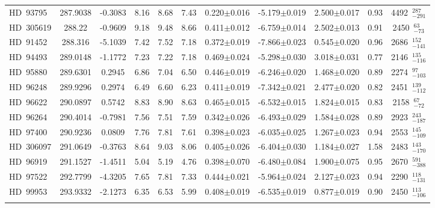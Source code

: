 {\begin{longtable}{lcccccccccc}
\noalign{\smallskip}
HD~93795 & 287.9038 & -0.3083 & 8.16 & 8.68 & 7.43 & 0.220$\pm$0.016 & -5.179$\pm$0.019 & 2.500$\pm$0.017 & 0.93 & 4492~$_{-291}^{287}$ \\
\noalign{\smallskip}
HD~305619 & 288.22 & -0.9609 & 9.18 & 9.48 & 8.66 & 0.411$\pm$0.012 & -6.759$\pm$0.014 & 2.502$\pm$0.013 & 0.91 & 2450~$_{-73}^{63}$ \\
\noalign{\smallskip}
HD~91452 & 288.316 & -5.1039 & 7.42 & 7.52 & 7.18 & 0.372$\pm$0.019 & -7.866$\pm$0.023 & 0.545$\pm$0.020 & 0.96 & 2686~$_{-141}^{152}$ \\
\noalign{\smallskip}
HD~94493 & 289.0148 & -1.1772 & 7.23 & 7.22 & 7.18 & 0.469$\pm$0.024 & -5.298$\pm$0.030 & 3.018$\pm$0.031 & 0.77 & 2146~$_{-116}^{135}$ \\
\noalign{\smallskip}
HD~95880 & 289.6301 & 0.2945 & 6.86 & 7.04 & 6.50 & 0.446$\pm$0.019 & -6.246$\pm$0.020 & 1.468$\pm$0.020 & 0.89 & 2274~$_{-103}^{97}$ \\
\noalign{\smallskip}
HD~96248 & 289.9296 & 0.2974 & 6.49 & 6.60 & 6.23 & 0.411$\pm$0.019 & -7.342$\pm$0.021 & 2.477$\pm$0.020 & 0.82 & 2451~$_{-112}^{139}$ \\
\noalign{\smallskip}
HD~96622 & 290.0897 & 0.5742 & 8.83 & 8.90 & 8.63 & 0.465$\pm$0.015 & -6.532$\pm$0.015 & 1.824$\pm$0.015 & 0.83 & 2158~$_{-72}^{67}$ \\
\noalign{\smallskip}
HD~96264 & 290.4014 & -0.7981 & 7.56 & 7.51 & 7.59 & 0.342$\pm$0.026 & -6.493$\pm$0.029 & 1.584$\pm$0.028 & 0.89 & 2923~$_{-187}^{243}$ \\
\noalign{\smallskip}
HD~97400 & 290.9236 & 0.0809 & 7.76 & 7.81 & 7.61 & 0.398$\pm$0.023 & -6.035$\pm$0.025 & 1.267$\pm$0.023 & 0.94 & 2553~$_{-109}^{145}$ \\
\noalign{\smallskip}
HD~306097 & 291.0649 & -0.3763 & 8.64 & 9.03 & 8.06 & 0.405$\pm$0.026 & -6.404$\pm$0.030 & 1.184$\pm$0.027 & 1.58 & 2483~$_{-170}^{143}$ \\
\noalign{\smallskip}
HD~96919 & 291.1527 & -1.4511 & 5.04 & 5.19 & 4.76 & 0.398$\pm$0.070 & -6.480$\pm$0.084 & 1.900$\pm$0.075 & 0.95 & 2670~$_{-388}^{591}$ \\
\noalign{\smallskip}
HD~97522 & 292.7799 & -4.3205 & 7.65 & 7.81 & 7.33 & 0.444$\pm$0.021 & -5.964$\pm$0.024 & 2.127$\pm$0.023 & 0.94 & 2290~$_{-131}^{118}$ \\
\noalign{\smallskip}
HD~99953 & 293.9332 & -2.1273 & 6.35 & 6.53 & 5.99 & 0.408$\pm$0.019 & -6.535$\pm$0.019 & 0.877$\pm$0.019 & 0.90 & 2450~$_{-106}^{113}$ \\
\noalign{\smallskip}

\end{longtable}}
